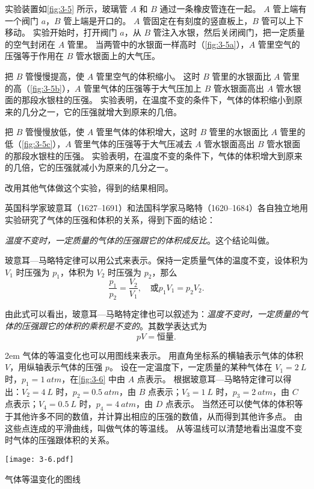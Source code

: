 实验装置如\cref{fig:3-5} 所示，玻璃管 $A$ 和 $B$ 通过一条橡皮管连在一起。
$A$ 管上端有一个阀门 $a$，$B$ 管上端是开口的。
$A$ 管固定在有刻度的竖直板上，$B$ 管可以上下移动。
实验开始时，打开阀门 $a$，从 $B$ 管注入水银，然后关闭阀门，把一定质量的空气封闭在 $A$ 管里。
当两管中的水银面一样高时（\cref{fig:3-5a}），$A$ 管里空气的压强等于作用在 $B$ 管水银面上的大气压。

把 $B$ 管慢慢提高，使 $A$ 管里空气的体积缩小。
这时 $B$ 管里的水银面比 $A$ 管里的高（\cref{fig:3-5b}），$A$ 管里气体的压强等于大气压加上 $B$ 管水银面高出 $A$ 管水银面的那段水银柱的压强。
实验表明，在温度不变的条件下，气体的体积缩小到原来的几分之一，它的压强就增大到原来的几倍。

把 $B$ 管慢慢放低，使 $A$ 管里气体的体积增大，这时 $B$ 管里的水银面比 $A$ 管里的低（\cref{fig:3-5c}），$A$ 管里气体的压强等于大气压减去 $A$ 管水银面高出 $B$ 管水银面的那段水银柱的压强。
实验表明，在温度不变的条件下，气体的体积增大到原来的几倍，它的压强就减小为原来的几分之一。

改用其他气体做这个实验，得到的结果相同。

英国科学家玻意耳（1627--1691）和法国科学家马略特（1620--1684）各自独立地用实验研究了气体的压强和体积的关系，得到下面的结论：

\emph{温度不变时，一定质量的气体的压强跟它的体积成反比}。这个结论叫做。

玻意耳—马略特定律可以用公式来表示。保持一定质量气体的温度不变，设体积为 $V_1$ 时压强为 $p_1$，体积为 $V_2$ 时压强为 $p_2$，那么
\[\frac{p_1}{p_2}=\frac{V_2}{V_1}, \quad\text{或} p_1V_1=p_2V_2.\]

由此式可以看出，玻意耳—马略特定律也可以叙述为：\emph{温度不变时，一定质量的气体的压强跟它的体积的乘积是不变的}。其数学表达式为
\[pV=\text{恒量}.\]

\medskip\noindent
\begin{minipage}{0.52\linewidth}\parindent2em
气体的等温变化也可以用图线来表示。
用直角坐标系的横轴表示气体的体积 $V$，用纵轴表示气体的压强 $p$。
设在一定温度下，一定质量的某种气体在 $V_1=\qty{2}{L}$ 时，$p_1=\qty{1}{atm}$，在\cref{fig:3-6} 中由 $A$ 点表示。
根据玻意耳—马略特定律可以得出：$V_2=\qty{4}{L}$ 时，$p_2=\qty{0.5}{atm}$，由 $B$ 点表示；$V_3=\qty{1}{L}$ 时，$p_3=\qty{2}{atm}$，由 $C$ 点表示；$V_4=\qty{0.5}{L}$ 时，$p_4=\qty{4}{atm}$，由 $D$ 点表示。
当然还可以使气体的体积等于其他许多不同的数值，并计算出相应的压强的数值，从而得到其他许多点。
由这些点连成的平滑曲线，叫做气体的等温线。
从等温线可以清楚地看出温度不变时气体的压强跟体积的关系。
\end{minipage}\hfill
\begin{minipage}{0.43\linewidth}\centering
\begin{figurehere}
	\texttt{[image: 3-6.pdf]}
	\caption{气体等温变化的图线}\label{fig:3-6}
\end{figurehere}
\end{minipage}

